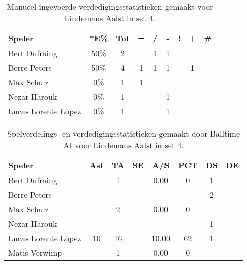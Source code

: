 \begin{table}[ht!]
    \centering
    \scriptsize
    \begin{tabular}{|l|c|c|c|c|c|c|c|c|}
        \hline
        \textbf{Speler} & *E\% & Tot & = & / & - & ! & + & \# \\ \hline
        Bert Dufraing & 50\% & 2 &  & 1 & 1 &  &  & \\ 
        Berre Peters & 50\% & 4 & 1 & 1 & 1 & & 1 &  \\ 
        Max Schulz & 0\% & 1 & 1 &  &  &  &  & \\ 
        Nezar Harouk & 0\% & 1 &  &  & 1 &  &  &  \\ 
        Lucas Lorente Lòpez & 0\% & 1 &  &  & 1 &  &  & \\ \hline
    \end{tabular}
    \caption[Manueel ingevoerde verdedigingsstatistieken gemaakt voor Lindemans Aalst in set 4]{\label{tab:PL3DigAalstMan4}Manueel ingevoerde verdedigingsstatistieken gemaakt voor Lindemans Aalst in set 4.}
\end{table}

\begin{table}[ht!]
  \centering
  \scriptsize
  \begin{tabular}{|l|c|c|c|c|c|c|c|} \hline
    \textbf{Speler} & Ast & TA & SE & A/S & PCT & DS &  DE \\ \hline
    Bert Dufraing &  & 1 &  & 0.00 & 0 & 1 &  \\
    Berre Peters &   &   &   &   &   & 2 &   \\
    Max Schulz &  & 2 &  & 0.00 & 0 &   &   \\
    Nezar Harouk &   &   &   &   &   &  1 &   \\
    Lucas Lorente Lòpez & 10 & 16 &  & 10.00 & 62 & 1 &  \\
    Matis Verwimp &  & 1 &  & 0.00 & 0 &   &   \\ \hline
  \end{tabular}
 \caption[Spelverdelings- en verdedigingsstatistieken gemaakt door Balltime AI voor Lindemans Aalst in set 4]{\label{tab:PL3SetDigAalstAI4}Spelverdelings- en verdedigingsstatistieken gemaakt door Balltime AI voor Lindemans Aalst in set 4.}
\end{table}


